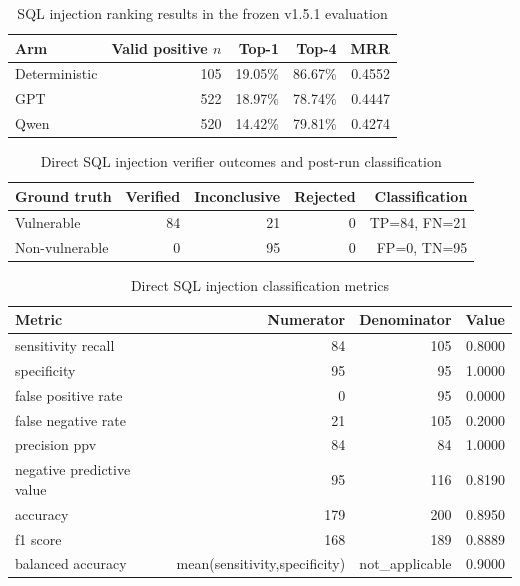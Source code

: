 \begin{table}[htbp]
\centering
\caption{SQL injection ranking results in the frozen v1.5.1 evaluation}
\begin{tabular}{lrrrr}
\hline
Arm & Valid positive $n$ & Top-1 & Top-4 & MRR \\
\hline
Deterministic & 105 & 19.05\% & 86.67\% & 0.4552 \\
GPT & 522 & 18.97\% & 78.74\% & 0.4447 \\
Qwen & 520 & 14.42\% & 79.81\% & 0.4274 \\
\hline
\end{tabular}
\end{table}

\begin{table}[htbp]
\centering
\caption{Direct SQL injection verifier outcomes and post-run classification}
\begin{tabular}{lrrrr}
\hline
Ground truth & Verified & Inconclusive & Rejected & Classification \\
\hline
Vulnerable & 84 & 21 & 0 & TP=84, FN=21 \\
Non-vulnerable & 0 & 95 & 0 & FP=0, TN=95 \\
\hline
\end{tabular}
\end{table}

\begin{table}[htbp]
\centering
\caption{Direct SQL injection classification metrics}
\begin{tabular}{lrrr}
\hline
Metric & Numerator & Denominator & Value \\
\hline
sensitivity recall & 84 & 105 & 0.8000 \\
specificity & 95 & 95 & 1.0000 \\
false positive rate & 0 & 95 & 0.0000 \\
false negative rate & 21 & 105 & 0.2000 \\
precision ppv & 84 & 84 & 1.0000 \\
negative predictive value & 95 & 116 & 0.8190 \\
accuracy & 179 & 200 & 0.8950 \\
f1 score & 168 & 189 & 0.8889 \\
balanced accuracy & mean(sensitivity,specificity) & not_applicable & 0.9000 \\
\hline
\end{tabular}
\end{table}
